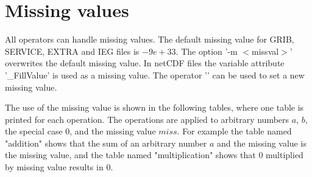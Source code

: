 \section{Missing values}

All operators can handle missing values.
The default missing value for GRIB, SERVICE, EXTRA and IEG files is $-9e+33$. 
The {\CDO} option '-m $<$missval$>$' overwrites the default missing value.
In netCDF files the variable attribute '\_FillValue' is used as a missing value.
The operator '' can be used to set a new missing value.

The {\CDO} use of the missing value is shown in the following tables,
where one table is printed for each operation.
The operations are applied to arbitrary numbers $a$, $b$, the special case $0$,
and the missing value $miss$.
For example the table named "addition" shows that the sum of an
arbitrary number $a$ and the missing value is the missing value,
and the table named "multiplication" shows that $0$ multiplied by missing
value results in $0$.

